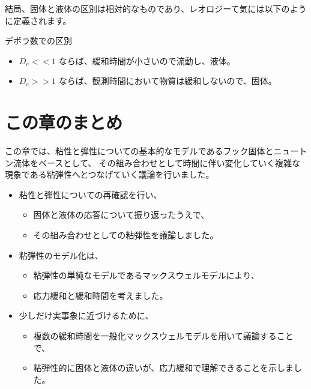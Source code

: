 \documentclass[uplatex,dvipdfmx,a4paper,11pt]{jsreport}
\begin{document}
結局、固体と液体の区別は相対的なものであり、レオロジーて気には以下のように定義されます。

	\begin{center}
		\begin{minipage}{0.9\textwidth}
			\begin{center}
				\begin{itembox}[l]{デボラ数での区別}
					\begin{itemize}
						\item $D_e << 1$ ならば、緩和時間が小さいので流動し、液体。
						\item $D_e >> 1$ ならば、観測時間において物質は緩和しないので、固体。
					\end{itemize}
				\end{itembox}
			\end{center}
		\end{minipage}
	\end{center}

\section*{この章のまとめ}
この章では、粘性と弾性についての基本的なモデルであるフック固体とニュートン流体をベースとして、
その組み合わせとして時間に伴い変化していく複雑な現象である粘弾性へとつなげていく議論を行いました。
\begin{boxnote}
    \begin{itemize}
        \item 粘性と弾性についての再確認を行い、
            \begin{itemize}
                \item 固体と液体の応答について振り返ったうえで、
                \item その組み合わせとしての粘弾性を議論しました。
            \end{itemize} 
        \item 粘弾性のモデル化は、
            \begin{itemize}
                \item 粘弾性の単純なモデルであるマックスウェルモデルにより、
                \item 応力緩和と緩和時間を考えました。
            \end{itemize} 
        \item 少しだけ実事象に近づけるために、
            \begin{itemize}
                \item 複数の緩和時間を一般化マックスウェルモデルを用いて議論することで、
                \item 粘弾性的に固体と液体の違いが、応力緩和で理解できることを示しました。
            \end{itemize}
    \end{itemize}
\end{boxnote}
\end{document}
